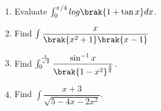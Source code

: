 \begin{enumerate}
\item Evaluate $\int_{0}^{\pi/4} log\brak{1+ \tan{x}}dx$.\\

\item Find $\int \dfrac{x}{\brak{x^{2}+1}\brak{x-1}}$

\item Find $\int_0^{\frac{1}{\sqrt{2}}} \dfrac{\sin^{-1}{x}}{\brak{1-x^{2}}^{\frac{3}{2}}}$.\\

\item Find $\int \dfrac{x+3}{\sqrt{5-4x-2x^2}}$.
\end{enumerate}
